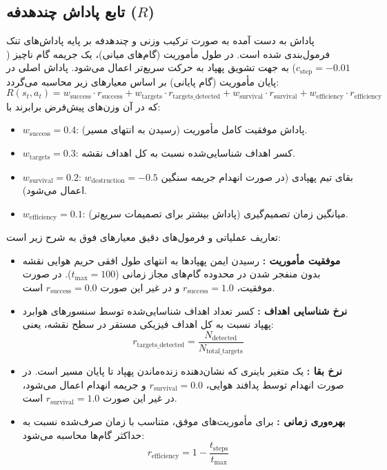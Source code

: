\documentclass[oneside,openany,a4paper,12pt]{article}
\begin{document}
\subsection{تابع پاداش چندهدفه ($R$)}
پاداش به دست آمده به صورت ترکیب وزنی و چندهدفه بر پایه پاداش‌های تنک  فرمول‌بندی شده است. در طول مأموریت (گام‌های میانی)، یک جریمه گام ناچیز ($c_{\text{step}} = -0.01$) به جهت تشویق پهپاد به حرکت سریع‌تر اعمال می‌شود. پاداش اصلی در پایان مأموریت (گام پایانی) بر اساس معیارهای زیر محاسبه می‌گردد:
\begin{equation}
R(s_t, a_t) = w_{\text{success}} \cdot r_{\text{success}} + w_{\text{targets}} \cdot r_{\text{targets\_detected}} + w_{\text{survival}} \cdot r_{\text{survival}} + w_{\text{efficiency}} \cdot r_{\text{efficiency}}
\end{equation}
که در آن وزن‌های پیش‌فرض برابرند با:
\begin{itemize}
    \item $w_{\text{success}} = 0.4$: پاداش موفقیت کامل مأموریت (رسیدن به انتهای مسیر).
    \item $w_{\text{targets}} = 0.3$: کسر اهداف شناسایی‌شده نسبت به کل اهداف نقشه.
    \item $w_{\text{survival}} = 0.2$: بقای تیم پهپادی (در صورت انهدام جریمه سنگین $w_{\text{destruction}} = -0.5$ اعمال می‌شود).
    \item $w_{\text{efficiency}} = 0.1$: میانگین زمان تصمیم‌گیری (پاداش بیشتر برای تصمیمات سریع‌تر).
\end{itemize}

تعاریف عملیاتی و فرمول‌های دقیق معیارهای فوق به شرح زیر است:
\begin{itemize}
    \item \textbf{موفقیت مأموریت :} رسیدن ایمن پهپادها به انتهای طول افقی حریم هوایی نقشه بدون منفجر شدن در محدوده گام‌های مجاز زمانی ($t_{\text{max}} = 100$). در صورت موفقیت، $r_{\text{success}} = 1.0$ و در غیر این صورت $r_{\text{success}} = 0.0$ است.
    \item \textbf{نرخ شناسایی اهداف :} کسر تعداد اهداف شناسایی‌شده توسط سنسورهای هوابرد پهپاد نسبت به کل اهداف فیزیکی مستقر در سطح نقشه، یعنی:
    \begin{equation}
    r_{\text{targets\_detected}} = \frac{N_{\text{detected}}}{N_{\text{total\_targets}}}
    \end{equation}
    \item \textbf{نرخ بقا :} یک متغیر باینری که نشان‌دهنده زنده‌ماندن پهپاد تا پایان مسیر است. در صورت انهدام توسط پدافند هوایی، $r_{\text{survival}} = 0.0$ و جریمه انهدام اعمال می‌شود، در غیر این صورت $r_{\text{survival}} = 1.0$ است.
    \item \textbf{بهره‌وری زمانی :} برای مأموریت‌های موفق، متناسب با زمان صرف‌شده نسبت به حداکثر گام‌ها محاسبه می‌شود:
    \begin{equation}
    r_{\text{efficiency}} = 1 - \frac{t_{\text{steps}}}{t_{\text{max}}}
    \end{equation}
\end{itemize}
\end{document}
